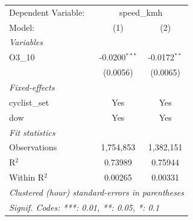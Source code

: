 \begingroup
\centering
\begin{tabular}{lcc}
   \tabularnewline \midrule \midrule
   Dependent Variable: & \multicolumn{2}{c}{speed\_kmh}\\
   Model:        & (1)             & (2)\\  
   \midrule
   \emph{Variables}\\
   O3\_10        & -0.0200$^{***}$ & -0.0172$^{**}$\\   
                 & (0.0056)        & (0.0065)\\   
   \midrule
   \emph{Fixed-effects}\\
   cyclist\_set  & Yes             & Yes\\  
   dow           & Yes             & Yes\\  
   \midrule
   \emph{Fit statistics}\\
   Observations  & 1,754,853       & 1,382,151\\  
   R$^2$         & 0.73989         & 0.75944\\  
   Within R$^2$  & 0.00265         & 0.00331\\  
   \midrule \midrule
   \multicolumn{3}{l}{\emph{Clustered (hour) standard-errors in parentheses}}\\
   \multicolumn{3}{l}{\emph{Signif. Codes: ***: 0.01, **: 0.05, *: 0.1}}\\
\end{tabular}
\par\endgroup
